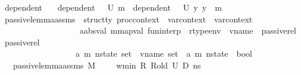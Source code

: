 \begin{isabellebody}
\isanewline
{}\isamarkupfalse%
\isanewline
\isanewline
\isanewline
{}\isamarkupfalse%
\ dependent{\isacharunderscore}{\kern0pt}{}\isanewline
\ \ \ {\isachardoublequoteopen}dependent{\isacharunderscore}{\kern0pt}{}\ {\isasymLambda}{\isacharprime}{\kern0pt}\ {\isasymOmega}\ U{}\ m\ {\isacharequal}{\kern0pt}\ dependent\ {\isasymLambda}{\isacharprime}{\kern0pt}\ {\isasymOmega}\ U{}\ {\isacharbraceleft}{\kern0pt}y{\isachardot}{\kern0pt}\ y\ {\isasymle}\ m{\isacharbraceright}{\kern0pt}{\isachardoublequoteclose}\isanewline
\isanewline
{}\isamarkupfalse%
\ passive{\isacharunderscore}{\kern0pt}lemma{\isacharunderscore}{\kern0pt}assms{\isacharunderscore}{\kern0pt}{}\ {\isacharcolon}{\kern0pt}{\isacharcolon}{\kern0pt}\ {\isachardoublequoteopen}{\isacharprime}{\kern0pt}struct{\isacharunderscore}{\kern0pt}ty\ proc{\isacharunderscore}{\kern0pt}context\ {\isasymRightarrow}\ var{\isacharunderscore}{\kern0pt}context\ {\isasymRightarrow}\ var{\isacharunderscore}{\kern0pt}context\ {\isasymRightarrow}\ \isanewline
\ \ \ \ \ \ \ \ \ \ \ \ \ \ \ \ \ \ \ {\isacharparenleft}{\kern0pt}{\isacharprime}{\kern0pt}a{\isacharcolon}{\kern0pt}{\isacharcolon}{\kern0pt}absval{\isacharcomma}{\kern0pt}\ {\isacharprime}{\kern0pt}m{\isacharcolon}{\kern0pt}{\isacharcolon}{\kern0pt}mapval{\isacharparenright}{\kern0pt}\ fun{\isacharunderscore}{\kern0pt}interp\ {\isasymRightarrow}\ rtype{\isacharunderscore}{\kern0pt}env\ {\isasymRightarrow}\ vname\ {\isasymRightarrow}\ passive{\isacharunderscore}{\kern0pt}rel\ {\isasymRightarrow}\ passive{\isacharunderscore}{\kern0pt}rel\ {\isasymRightarrow}\ \isanewline
\ \ \ \ \ \ \ \ \ \ \ \ \ \ \ \ \ \ {\isacharparenleft}{\kern0pt}{\isacharparenleft}{\kern0pt}{\isacharprime}{\kern0pt}a{\isacharcomma}{\kern0pt}\ {\isacharprime}{\kern0pt}m{\isacharparenright}{\kern0pt}\ nstate{\isacharparenright}{\kern0pt}\ set\ {\isasymRightarrow}\ vname\ set\ {\isasymRightarrow}\ {\isacharparenleft}{\kern0pt}{\isacharprime}{\kern0pt}a{\isacharcomma}{\kern0pt}\ {\isacharprime}{\kern0pt}m{\isacharparenright}{\kern0pt}\ nstate\ {\isasymRightarrow}\ bool{\isachardoublequoteclose}\isanewline
\ \ \ {\isachardoublequoteopen}passive{\isacharunderscore}{\kern0pt}lemma{\isacharunderscore}{\kern0pt}assms{\isacharunderscore}{\kern0pt}{}\ M\ {\isasymLambda}\ {\isasymLambda}{\isacharprime}{\kern0pt}\ {\isasymGamma}\ {\isasymOmega}\ w{\isacharunderscore}{\kern0pt}min\ R\ R{\isacharunderscore}{\kern0pt}old\ U{}\ D{}\ ns\ {\isacharequal}{\kern0pt}\ \isanewline

\end{isabellebody}
